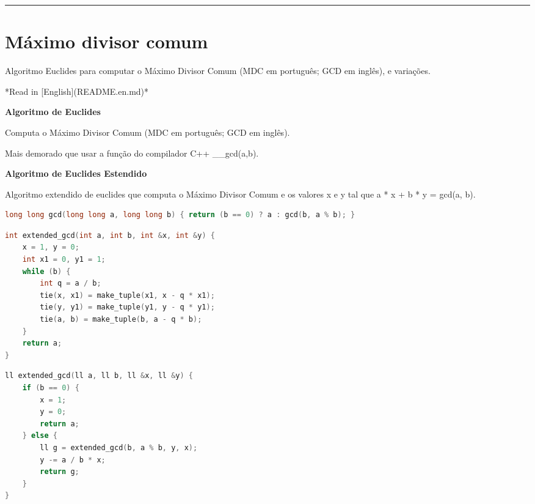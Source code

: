 \documentclass[11pt, a4paper, twoside]{book}
\begin{document}
\hfill

\rule{\textwidth}{0.4pt}

\section{Máximo divisor comum}



Algoritmo Euclides para computar o Máximo Divisor Comum (MDC em português; GCD em inglês), e variações.



*Read in [English](README.en.md)*



\textbf{Algoritmo de Euclides} 



Computa o Máximo Divisor Comum (MDC em português; GCD em inglês).





Mais demorado que usar a função do compilador C++ \_\_gcd(a,b).



\textbf{Algoritmo de Euclides Estendido} 



Algoritmo extendido de euclides que computa o Máximo Divisor Comum e os valores x e y tal que a * x + b * y = gcd(a, b).




\hfill

\begin{lstlisting}[language=C++]
long long gcd(long long a, long long b) { return (b == 0) ? a : gcd(b, a % b); }
\end{lstlisting}

\hfill

\begin{multicols}{2}
\begin{lstlisting}[language=C++]
int extended_gcd(int a, int b, int &x, int &y) {
    x = 1, y = 0;
    int x1 = 0, y1 = 1;
    while (b) {
        int q = a / b;
        tie(x, x1) = make_tuple(x1, x - q * x1);
        tie(y, y1) = make_tuple(y1, y - q * y1);
        tie(a, b) = make_tuple(b, a - q * b);
    }
    return a;
}
\end{lstlisting}
\end{multicols}

\hfill

\begin{multicols}{2}
\begin{lstlisting}[language=C++]
ll extended_gcd(ll a, ll b, ll &x, ll &y) {
    if (b == 0) {
        x = 1;
        y = 0;
        return a;
    } else {
        ll g = extended_gcd(b, a % b, y, x);
        y -= a / b * x;
        return g;
    }
}
\end{lstlisting}
\end{multicols}
\end{document}
